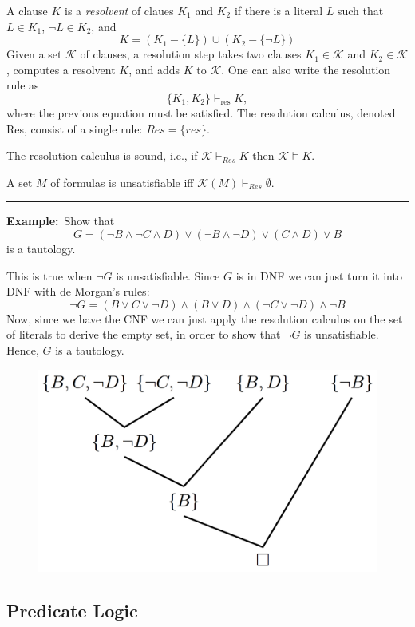 \documentclass[a4paper]{extarticle}
\newcommand{\Ex}{\textbf{Example:}\ }
\newcommand{\cK}{\mathcal{K}}
\newcommand{\derives}{\vdash}
\newcommand{\sep}{\vspace{5pt}\noindent\hrule\vspace{5pt}}
\begin{document}
\begin{multicols*}{2}
\Def[Resolvent] A clause $K$ is a \emph{resolvent} of claues $K_1$ and $K_2$ if
there is a literal $L$ such that $L\in K_1$, $\lnot L\in K_2$, and
\[
K=(K_1-\{L\}) \cup (K_2-\{\lnot L\})
\]
Given a set $\cK$ of clauses, a resolution step takes two clauses $K_1\in \cK$
and $K_2\in \cK$, computes a resolvent $K$, and adds $K$ to $\cK$. One can also
write the resolution rule as 
\[
\{K_1,K_2\}\derives_{\text{res}}K,
\]
where the previous equation must be satisfied. The resolution calculus, denoted
Res, consist of a single rule: $Res=\{res\}$.

\Lem The resolution calculus is sound, i.e., if $\cK\derives_{Res}K$ then
$\cK \models K$.

\Thm A set $M$ of formulas is unsatisfiable iff $\cK(M)\derives_{Res}\emptyset$.

\sep

\Ex Show that
\[
G=(\lnot B\land \lnot C \land D)\lor(\lnot B \land \lnot
D)\lor(C\land D)\lor B
\]
is a tautology.

This is true when $\lnot G$ is unsatisfiable. Since $G$ is in DNF we can just
turn it into DNF with de Morgan's rules:
\[
\lnot G=( B\lor C \lor \lnot D)\land( B \lor 
D)\land(\lnot C\lor \lnot D)\land \lnot B
\]
Now, since we have the CNF we can just apply the resolution calculus on the set
of literals to derive the empty set, in order to show that $\lnot G$ is
unsatisfiable. Hence, $G$ is a tautology.

\begin{figure}[H]
 	\centering
  	\includegraphics[width=0.55\linewidth]{img/resolution.png}
\end{figure}

\subsection{Predicate Logic}


\end{multicols*}
\end{document}
